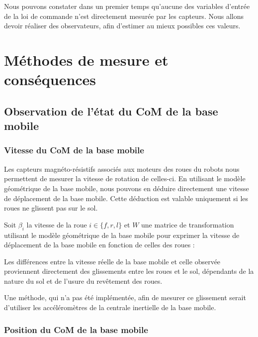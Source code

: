 		Nous pouvons constater dans un premier temps qu'aucune des variables d'entrée de la loi de commande n'est directement mesurée par les capteurs.
		Nous allons devoir réaliser des observateurs, afin d'estimer au mieux possibles ces valeurs.

	\section{Méthodes de mesure et conséquences}
		\subsection{Observation de l'état du CoM de la base mobile}
		
		\label{section.observateurbase}	
			\subsubsection{Vitesse du CoM de la base mobile}
			
				Les capteurs magnéto-résistifs associés aux moteurs des roues du robots nous permettent de mesurer la vitesse de rotation de celles-ci.
				En utilisant le modèle géométrique de la base mobile, nous pouvons en déduire directement une vitesse de déplacement de la base mobile.
				Cette déduction est valable uniquement si les roues ne glissent pas sur le sol.
				
				Soit $\beta_i$ la vitesse de la roue $i \in \{f, r, l\}$ et $W$ une matrice de transformation utilisant le modèle géométrique de la base mobile pour exprimer la vitesse de déplacement de la base mobile en fonction de celles des roues :
				
				Les différences entre la vitesse réelle de la base mobile et celle observée proviennent directement des glissements entre les roues et le sol, dépendants de la nature du sol et de l'usure du revêtement des roues.
				
				Une méthode, qui n'a pas été implémentée, afin de mesurer ce glissement serait d'utiliser les accéléromètres de la centrale inertielle de la base mobile. 
			
			\subsubsection{Position du CoM de la base mobile}
			
